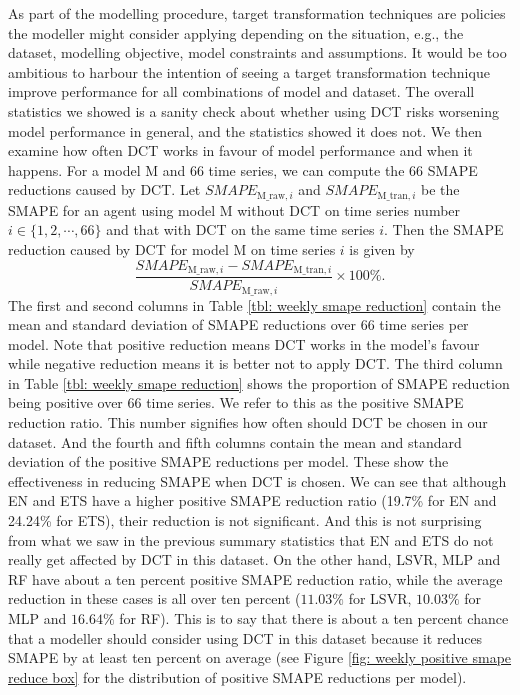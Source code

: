 As part of the modelling procedure, target transformation techniques are policies the modeller might consider applying depending on the situation, e.g., the dataset, modelling objective, model constraints and assumptions. It would be too ambitious to harbour the intention of seeing a target transformation technique improve performance for all combinations of model and dataset. The overall statistics we showed is a sanity check about whether using DCT risks worsening model performance in general, and the statistics showed it does not. We then examine how often DCT works in favour of model performance and when it happens. For a model M and $66$ time series, we can compute the $66$ SMAPE reductions caused by DCT. Let $SMAPE_{\text{M\_raw}, i}$ and $SMAPE_{\text{M\_tran}, i}$ be the SMAPE for an agent using model M without DCT on time series number $i \in \{1, 2, \cdots, 66\}$ and that with DCT on the same time series $i$. Then the SMAPE reduction caused by DCT for model M on time series $i$ is given by
\begin{equation*}
    \frac{SMAPE_{\text{M\_raw}, i} - SMAPE_{\text{M\_tran}, i}}{SMAPE_{\text{M\_raw}, i}} \times 100 \%.
\end{equation*}
The first and second columns in Table \ref{tbl: weekly smape reduction} contain the mean and standard deviation of SMAPE reductions over $66$ time series per model. Note that positive reduction means DCT works in the model's favour while negative reduction means it is better not to apply DCT. The third column in Table \ref{tbl: weekly smape reduction} shows the proportion of SMAPE reduction being positive over $66$ time series. We refer to this as the positive SMAPE reduction ratio. This number signifies how often should DCT be chosen in our dataset. And the fourth and fifth columns contain the mean and standard deviation of the positive SMAPE reductions per model. These show the effectiveness in reducing SMAPE when DCT is chosen. We can see that although EN and ETS have a higher positive SMAPE reduction ratio (19.7\% for EN and 24.24\% for ETS), their reduction is not significant. And this is not surprising from what we saw in the previous summary statistics that EN and ETS do not really get affected by DCT in this dataset. On the other hand, LSVR, MLP and RF have about a ten percent positive SMAPE reduction ratio, while the average reduction in these cases is all over ten percent ($11.03\%$ for LSVR, $10.03\%$ for MLP and $16.64\%$ for RF). This is to say that there is about a ten percent chance that a modeller should consider using DCT in this dataset because it reduces SMAPE by at least ten percent on average (see Figure \ref{fig: weekly positive smape reduce box} for the distribution of positive SMAPE reductions per model).
